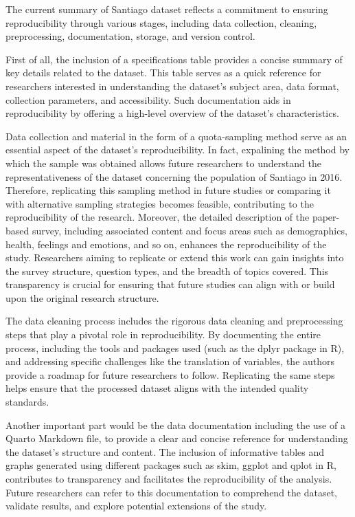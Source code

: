 \documentclass[
11pt, %
oneside, %
english, %
singlespacing, %
]{macthesis} %
\begin{document}
The current summary of Santiago dataset reflects a commitment to ensuring reproducibility through various stages, including data collection, cleaning, preprocessing, documentation, storage, and version control.

First of all, the inclusion of a specifications table provides a concise summary of key details related to the dataset. This table serves as a quick reference for researchers interested in understanding the dataset's subject area, data format, collection parameters, and accessibility. Such documentation aids in reproducibility by offering a high-level overview of the dataset's characteristics.

Data collection and material in the form of a quota-sampling method serve as an essential aspect of the dataset's reproducibility. In fact, expalining the method by which the sample was obtained allows future researchers to understand the representativeness of the dataset concerning the population of Santiago in 2016. Therefore, replicating this sampling method in future studies or comparing it with alternative sampling strategies becomes feasible, contributing to the reproducibility of the research. Moreover, the detailed description of the paper-based survey, including associated content and focus areas such as demographics, health, feelings and emotions, and so on, enhances the reproducibility of the study. Researchers aiming to replicate or extend this work can gain insights into the survey structure, question types, and the breadth of topics covered. This transparency is crucial for ensuring that future studies can align with or build upon the original research structure.

The data cleaning process includes the rigorous data cleaning and preprocessing steps that play a pivotal role in reproducibility. By documenting the entire process, including the tools and packages used (such as the dplyr package in R), and addressing specific challenges like the translation of variables, the authors provide a roadmap for future researchers to follow. Replicating the same steps helps ensure that the processed dataset aligns with the intended quality standards.

Another important part would be the data documentation including the use of a Quarto Markdown file, to provide a clear and concise reference for understanding the dataset's structure and content. The inclusion of informative tables and graphs generated using different packages such as skim, ggplot and qplot in R, contributes to transparency and facilitates the reproducibility of the analysis. Future researchers can refer to this documentation to comprehend the dataset, validate results, and explore potential extensions of the study.
\end{document}
